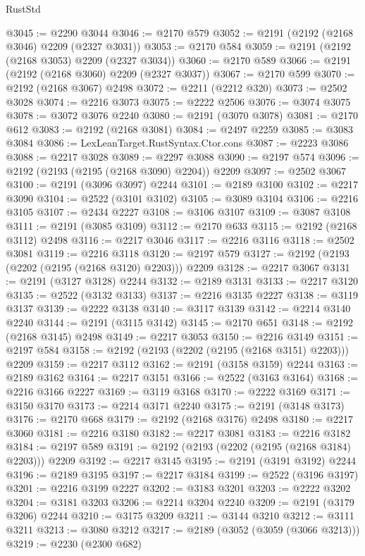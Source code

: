 \begin{lexlean}{RustStd}
\begin{coremodule}
@3045 := @2290 @3044
@3046 := @2170 @579
@3052 := @2191 (@2192 (@2168 @3046) @2209 (@2327 @3031))
@3053 := @2170 @584
@3059 := @2191 (@2192 (@2168 @3053) @2209 (@2327 @3034))
@3060 := @2170 @589
@3066 := @2191 (@2192 (@2168 @3060) @2209 (@2327 @3037))
@3067 := @2170 @599
@3070 := @2192 (@2168 @3067) @2498
@3072 := @2211 (@2212 @320)
@3073 := @2502 @3028
@3074 := @2216 @3073
@3075 := @2222 @2506
@3076 := @3074 @3075
@3078 := @3072 @3076 @2240
@3080 := @2191 (@3070 @3078)
@3081 := @2170 @612
@3083 := @2192 (@2168 @3081)
@3084 := @2497 @2259
@3085 := @3083 @3084
@3086 := LexLeanTarget.RustSyntax.Ctor.cons
@3087 := @2223 @3086
@3088 := @2217 @3028
@3089 := @2297 @3088
@3090 := @2197 @574
@3096 := @2192 (@2193 (@2195 (@2168 @3090) @2204)) @2209
@3097 := @2502 @3067
@3100 := @2191 (@3096 @3097) @2244
@3101 := @2189 @3100
@3102 := @2217 @3090
@3104 := @2522 (@3101 @3102)
@3105 := @3089 @3104
@3106 := @2216 @3105
@3107 := @2434 @2227
@3108 := @3106 @3107
@3109 := @3087 @3108
@3111 := @2191 (@3085 @3109)
@3112 := @2170 @633
@3115 := @2192 (@2168 @3112) @2498
@3116 := @2217 @3046
@3117 := @2216 @3116
@3118 := @2502 @3081
@3119 := @2216 @3118
@3120 := @2197 @579
@3127 := @2192 (@2193 (@2202 (@2195 (@2168 @3120) @2203))) @2209
@3128 := @2217 @3067
@3131 := @2191 (@3127 @3128) @2244
@3132 := @2189 @3131
@3133 := @2217 @3120
@3135 := @2522 (@3132 @3133)
@3137 := @2216 @3135 @2227
@3138 := @3119 @3137
@3139 := @2222 @3138
@3140 := @3117 @3139
@3142 := @2214 @3140 @2240
@3144 := @2191 (@3115 @3142)
@3145 := @2170 @651
@3148 := @2192 (@2168 @3145) @2498
@3149 := @2217 @3053
@3150 := @2216 @3149
@3151 := @2197 @584
@3158 := @2192 (@2193 (@2202 (@2195 (@2168 @3151) @2203))) @2209
@3159 := @2217 @3112
@3162 := @2191 (@3158 @3159) @2244
@3163 := @2189 @3162
@3164 := @2217 @3151
@3166 := @2522 (@3163 @3164)
@3168 := @2216 @3166 @2227
@3169 := @3119 @3168
@3170 := @2222 @3169
@3171 := @3150 @3170
@3173 := @2214 @3171 @2240
@3175 := @2191 (@3148 @3173)
@3176 := @2170 @668
@3179 := @2192 (@2168 @3176) @2498
@3180 := @2217 @3060
@3181 := @2216 @3180
@3182 := @2217 @3081
@3183 := @2216 @3182
@3184 := @2197 @589
@3191 := @2192 (@2193 (@2202 (@2195 (@2168 @3184) @2203))) @2209
@3192 := @2217 @3145
@3195 := @2191 (@3191 @3192) @2244
@3196 := @2189 @3195
@3197 := @2217 @3184
@3199 := @2522 (@3196 @3197)
@3201 := @2216 @3199 @2227
@3202 := @3183 @3201
@3203 := @2222 @3202
@3204 := @3181 @3203
@3206 := @2214 @3204 @2240
@3209 := @2191 (@3179 @3206) @2244
@3210 := @3175 @3209
@3211 := @3144 @3210
@3212 := @3111 @3211
@3213 := @3080 @3212
@3217 := @2189 (@3052 (@3059 (@3066 @3213)))
@3219 := @2230 (@2300 @682)

\end{coremodule}
\end{lexlean}
